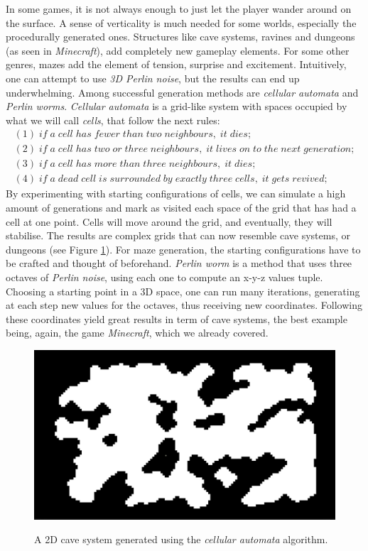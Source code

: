 In some games, it is not always enough to just let the player wander around on the surface. A sense of verticality is much needed for some worlds, especially the procedurally generated ones. Structures like cave systems, ravines and dungeons (as seen in \textit{Minecraft}), add completely new gameplay elements. For some other genres, mazes add the element of tension, surprise and excitement. Intuitively, one can attempt to use \textit{3D Perlin noise}, but the results can end up underwhelming. Among successful generation methods are \textit{cellular automata} and \textit{Perlin worms}. \textit{Cellular automata} is a grid-like system with spaces occupied by what we will call \textit{cells}, that follow the next rules:
\begin{gather*}
    (1)\;if\;a \;cell\;has\;fewer\;than\;two\;neighbours,\;it\;dies;\\
    (2)\;if\;a \;cell\;has\;two\;or\;three\;neighbours,\;it\;lives\;on\;to\;the\;next\;generation;\\
    (3)\;if\;a \;cell\;has\;more\;than\;three\;neighbours,\;it\;dies;\\
    (4)\;if\;a\;dead\;cell\;is\;surrounded\;by\;exactly\;three\;cells,\;it\;gets\;revived;
\end{gather*}
By experimenting with starting configurations of cells, we can simulate a high amount of generations and mark as visited each space of the grid that has had a cell at one point. Cells will move around the grid, and eventually, they will stabilise. The results are complex grids that can now resemble cave systems, or dungeons (see Figure \ref{fig:cellularAutomata}). For maze generation, the starting configurations have to be crafted and thought of beforehand. \textit{Perlin worm} is a method that uses three octaves of \textit{Perlin noise}, using each one to compute an x-y-z values tuple. Choosing a starting point in a 3D space, one can run many iterations, generating at each step new values for the octaves, thus receiving new coordinates. Following these coordinates yield great results in term of cave systems, the best example being, again, the game \textit{Minecraft}, which we already covered. 

\begin{figure}[htp]
    \centering
    \includegraphics[width = 16cm]{figures/cellularAutomata.png}
    \caption{A 2D cave system generated using the \textit{cellular automata} algorithm.}
    \cite{procCaveGen}
    \label{fig:cellularAutomata}
\end{figure}

